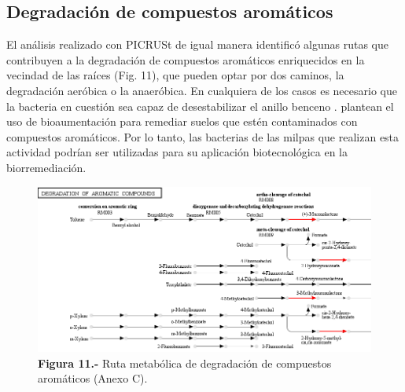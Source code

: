 \documentclass[12pt,letterpaper,oneside]{report}
\begin{document}
\subsection{Degradación de compuestos aromáticos}
El análisis realizado con PICRUSt de igual manera identificó algunas rutas que contribuyen a la degradación de compuestos aromáticos enriquecidos en la vecindad de las raíces (Fig. 11), que pueden optar por dos caminos, la degradación aeróbica o la anaeróbica. En cualquiera de los casos es necesario que la bacteria en cuestión sea capaz de desestabilizar el anillo benceno \autocite{Diaz2013}. \textcite{Mrozik2010} plantean el uso de bioaumentación para remediar suelos que estén contaminados con compuestos aromáticos. Por lo tanto, las bacterias de las milpas que realizan esta actividad podrían ser utilizadas para su aplicación biotecnológica en la biorremediación.
\begin{figure}[!h]
\centering
\includegraphics[width=14cm]{figuras/IMG_12}
\caption*{\textbf{Figura 11.-} Ruta metabólica de degradación de compuestos aromáticos (Anexo C).}
\label{Figura 12}
\end{figure}
\newpage
\end{document}
